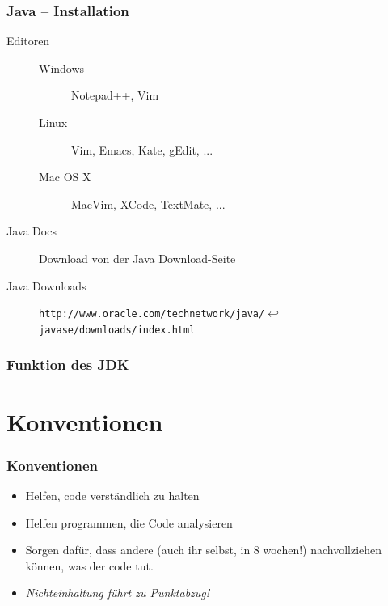 \documentclass{beamer}
\begin{document}
\begin{frame}[fragile]
\frametitle{Java -- Installation}
\begin{description}
\item[Editoren]
\begin{description}
\item[Windows] Notepad++, Vim
\item[Linux] Vim, Emacs, Kate, gEdit, ...
\item[Mac OS X] MacVim, XCode, TextMate, ...
\end{description}
\item[Java Docs] Download von der Java Download-Seite
\item[Java Downloads] \verb|http://www.oracle.com/technetwork/java/|$\hookleftarrow$\\
\verb|javase/downloads/index.html|
\end{description}
\end{frame}

\begin{frame}
\frametitle{Funktion des JDK}
\end{frame}


\section{Konventionen}
\begin{frame}
    \frametitle{Konventionen}
    \begin{itemize}
        \item Helfen, code verst\"{a}ndlich zu halten
        \item Helfen programmen, die Code analysieren
            \pause
        \item Sorgen daf\"{u}r, dass andere (auch ihr selbst, in 8 wochen!) nachvollziehen k\"{o}nnen, was der code tut.
            \pause
        \item \emph{Nichteinhaltung f\"{u}hrt zu Punktabzug!}
    \end{itemize}
\end{frame}
\end{document}
